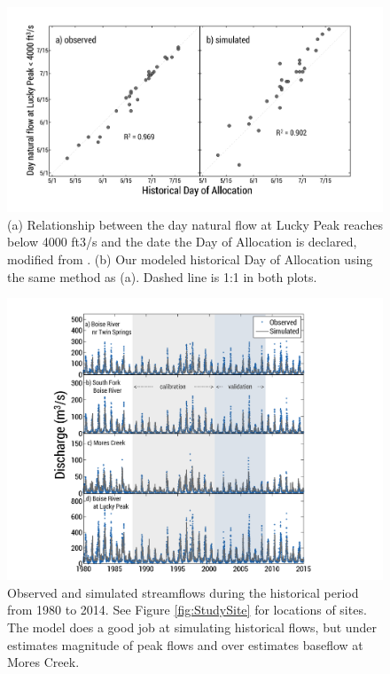 \documentclass[11pt,letterpaper]{article}
\begin{document}
\begin{figure}
\centering
\includegraphics[width=\textwidth]{figure-files/figure6.png}
\caption{(a) Relationship between the day natural flow at Lucky Peak reaches below 4000 ft3/s and the date the Day of Allocation is declared, modified from \citep{Garst:2017bg}.  (b) Our modeled historical Day of Allocation using the same method as (a). Dashed line is 1:1 in both plots.}
\label{fig:DayOfAllocation}
\end{figure}
\clearpage

\begin{figure}
\centering
\includegraphics[width=\textwidth]{figure-files/figure7.png}
\caption{Observed and simulated streamflows during the historical period from 1980 to 2014. See Figure \ref{fig:StudySite} for locations of sites. The model does a good job at simulating historical flows, but under estimates magnitude of peak flows and over estimates baseflow at Mores Creek.}
\label{fig:CalVal}
\end{figure}
\clearpage
\end{document}
